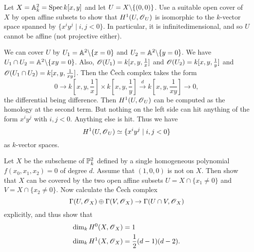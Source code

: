 \documentclass[11pt, english]{article}
\begin{document}
\begin{exc}[Exercise 4.3]
Let $X= \mathbb{A}^2_k=\operatorname{Spec} k[x,y]$ and let $U = X \backslash \{(0,0)\}$. Use a suitable open cover of $X$ by open affine subsets to show that $H^1(U,\operatorname{\mathscr{O}}_U)$ is isomorphic to the $k$-vector space spanned by $\{ x^i y^j \mid i,j < 0 \}$. In particular, it is infinitedimensional, and so $U$ cannot be affine (not projective either).  
\end{exc}
\begin{sol}
We can cover $U$ by $U_1= \mathbb{A}^2 \backslash \{ x= 0\}$ and $U_2 = \mathbb{A}^2 \backslash \{ y = 0\}$. We have $U_1 \cap U_2 = \mathbb{A}^2 \backslash \{ xy=0\}$. Also, $\operatorname{\mathscr{O}}(U_1)=k[x,y,\frac 1x]$ and $\operatorname{\mathscr{O}}(U_2)=k[x,y,\frac 1y]$ and $\operatorname{\mathscr{O}}(U_1 \cap U_2) = k[x,y,\frac {1}{xy}]$. Then the \v{C}ech complex takes the form
\[
0 \to k[x,y,\frac 1x] \times k[x,y, \frac 1y] \xrightarrow{d} k[x,y,\frac{1}{xy}] \to 0,
\]
the differential being difference. Then $H^1(U,\operatorname{\mathscr{O}}_U)$ can be computed as the homology at the second term. But nothing on the left side can hit anything of the form $x^iy^j$ with $i,j < 0$. Anything else is hit. Thus we have
\[
H^1(U, \operatorname{\mathscr{O}}_U) \simeq \{ x^i y^j \mid i,j < 0 \}
\]
as $k$-vector spaces.
\end{sol}

\begin{exc}[Exercise 4.7]
Let $X$ be the subscheme of $\mathbb{P}_k^2$ defined by a single homogeneous polynomial $f(x_0,x_1,x_2)=0$ of degree $d$. Assume that $(1,0,0)$ is not on $X$. Then show that $X$ can be covered by the two open affine subsets $U= X \cap \{ x_1 \neq 0\}$ and $V = X \cap \{ x_2 \neq 0\}$. Now calculate the \v Cech complex
\[
\Gamma(U,\operatorname{\mathscr{O}}_X) \oplus \Gamma(V,\operatorname{\mathscr{O}}_X) \to \Gamma(U \cap V, \operatorname{\mathscr{O}}_X)
\]
explicitly, and thus show that
\begin{align*}
  \dim_k H^0(X,\operatorname{\mathscr{O}}_X) &= 1 \\
\dim _k H^1(X,\operatorname{\mathscr{O}}_X) &= \frac 12 (d-1)(d-2).
\end{align*}
\end{exc}
\end{document}
